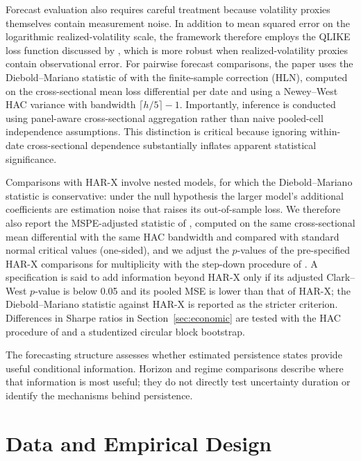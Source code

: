 \documentclass[jrfm,article,submit,moreauthors,pdftex]{Definitions/mdpi}
\begin{document}
Forecast evaluation also requires careful treatment because volatility
proxies themselves contain measurement noise. In addition to mean squared
error on the logarithmic realized-volatility scale, the framework therefore
employs the QLIKE loss function discussed by \citet{patton2011volatility},
which is more robust when realized-volatility proxies contain observational
error. For pairwise forecast comparisons, the paper uses the
Diebold--Mariano statistic of \citet{diebold1995comparing} with the
\citet{harvey1997testing} finite-sample correction (HLN), computed on the
cross-sectional mean loss differential per date and using a Newey--West HAC
variance \citep{newey1987simple} with bandwidth $\lceil h/5\rceil-1$. Importantly, inference is
conducted using panel-aware cross-sectional aggregation rather than naive
pooled-cell independence assumptions. This distinction is critical because
ignoring within-date cross-sectional dependence substantially inflates
apparent statistical significance.

Comparisons with HAR-X involve nested models, for which the
Diebold--Mariano statistic is conservative: under the null hypothesis the
larger model's additional coefficients are estimation noise that raises its
out-of-sample loss. We therefore also report the MSPE-adjusted statistic of
\citet{clark2007approximately}, computed on the same cross-sectional mean
differential with the same HAC bandwidth and compared with standard normal
critical values (one-sided), and we adjust the $p$-values of the
pre-specified HAR-X comparisons for multiplicity with the step-down
procedure of \citet{holm1979simple}. A specification is said to add
information beyond HAR-X only if its adjusted Clark--West $p$-value is
below 0.05 and its pooled MSE is lower than that of HAR-X; the
Diebold--Mariano statistic against HAR-X is reported as the stricter
criterion. Differences in Sharpe ratios in Section~\ref{sec:economic} are
tested with the HAC procedure of \citet{ledoit2008robust} and a
studentized circular block bootstrap.

The forecasting structure assesses whether estimated persistence states
provide useful conditional information. Horizon and regime comparisons
describe where that information is most useful; they do not directly test
uncertainty duration or identify the mechanisms behind persistence.

\section{Data and Empirical Design}
\label{sec:data}
\end{document}
